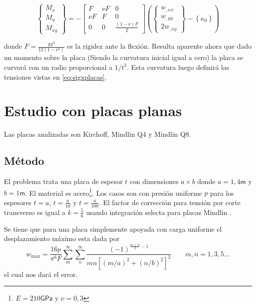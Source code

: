 \documentclass[onecolumn,10pt,titlepage]{article}
\newcommand{\unit}[1]{\textsf{#1}}
\newcommand{\giga}{\unit{G}}
\newcommand{\meter}{\unit{m}}
\newcommand{\pascal}{\unit{Pa}}
\newcommand{\si}[1]{#1}
\newcommand{\SI}[2]{#1\si{#2}}
\begin{document}
\begin{equation} \label{eq:constitutive}
\left\{\begin{array}{l}{M_{x}} \\ {M_{y}} \\ {M_{x y}}\end{array}\right\} =- \left[ \begin{array}{ccc}{F} & {\nu F} & {0} \\ {\nu F} & {F} & {0} \\ {0} & {0} & {\frac{(1-\nu) F}{2}}\end{array}\right] \left(\left\{\begin{array}{l}{w_{,x x}} \\ {w_{,y y}} \\ {2 w_{,x y}}\end{array}\right\}-\left\{\kappa_{0}\right\} \right)
\end{equation}

donde $F=\frac{E t^{3}}{12\left(1-\nu^{2}\right)}$ es la rigidez ante la flexión. Resulta aparente ahora que dado un momento sobre la placa (Siendo la curvatura inicial igual a cero) la placa se curvará con un radio proporcional a $1/t^3$. Esta curvatura luego definirá las tensiones vistas en \eqref{eq:sigxplacas}. 

\section{Estudio con placas planas}
Las placas analizadas son Kirchoff, Mindlin Q4 y Mindlin Q8.

\subsection{Método}
El problema trata una placa de espesor $t$ con dimensiones $a\times b$ donde $a=1,4\si{\meter}$ y $b=1\si{\meter}$. El material es acero\footnote{$E=\SI{210}{\giga \pascal}$ y $\nu=0,3$}. Los casos son con presión uniforme $p$ para los espesores $t=a$, $t=\frac{a}{10}$ y $t=\frac{a}{100}$. El factor de corrección para tensión por corte transverso es igual a $k=\frac{5}{6}$ usando integración selecta\citep{cook2007concepts} para placas Mindlin . 

Se tiene que para una placa simplemente apoyada con carga uniforme el desplazamiento máximo esta dada por \citep{ugural2003advanced}
\begin{equation}\label{eq:uguralwmax}
w_{\max }=\frac{16 p}{\pi^{6} F} \sum_{m}^{\infty} \sum_{n}^{\infty} \frac{(-1)^{\frac{m+n}{2}-1}}{m n\left[(m / a)^{2}+(n / b)^{2}\right]^{2}}\qquad m,n = 1,3,5 \ldots
\end{equation}
el cual nos dará el error.
\end{document}
